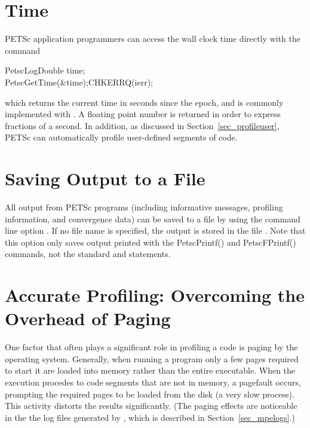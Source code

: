 {{%
\section{Time}

PETSc application programmers can access the wall clock time directly 
with the command 
\begin{tabbing}
  PetscLogDouble time;\\
  PetscGetTime(\&time);CHKERRQ(ierr);
\end{tabbing}
 
which returns the current time in seconds since the epoch, and is commonly
implemented with . A floating point number is returned in order
to express fractions of a second. In addition, as discussed in Section~\ref{sec_profileuser},
PETSc can automatically profile user-defined segments of code.

\section{Saving Output to a File}

All output from PETSc programs (including informative messages, profiling information,
and convergence data) can be saved to a file by using the command line
option . 
If no file name is specified, the output is stored in the file .
 Note that this option only saves output printed with 
the PetscPrintf() and PetscFPrintf() commands, not the
standard  and  statements. 
 

\section{Accurate Profiling: Overcoming the Overhead of Paging}
\label{sec_profaccuracy}

One factor that often plays a significant role in profiling a code is
paging by the operating system.  Generally, when running a program
only a few pages required to start it are loaded into memory rather
than the entire executable.  When the execution procedes to code
segments that are not in memory, a pagefault occurs, prompting the
required pages to be loaded from the disk (a very slow process).  This
activity distorts the results significantly. (The paging effects are
noticeable in the the log files generated by , which is
described in Section~\ref{sec_mpelogs}.)

}}
